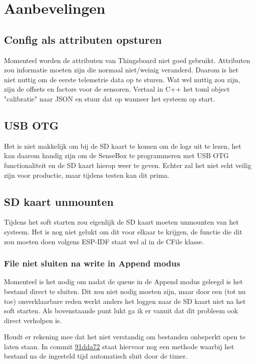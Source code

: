 \section{Aanbevelingen}

\subsection*{Config als attributen opsturen}

Momenteel worden de attributen van Thingsboard niet goed gebruikt. Attributen zou informatie moeten zijn die normaal niet/weinig veranderd. Daarom is het niet nuttig om de eerste telemetrie data op te sturen. Wat wel nuttig zou zijn, zijn de offsets en factors voor de sensoren. Vertaal in C++ het toml object "calibratie" naar JSON en stuur dat op wanneer het systeem op start.

\subsection*{USB OTG}

Het is niet makkelijk om bij de SD kaart te komen om de logs uit te lezen, het kan daarom handig zijn om de SenseBox te programmeren met USB OTG functionaliteit en de SD kaart hierop weer te geven. Echter zal het niet echt veilig zijn voor productie, maar tijdens testen kan dit prima.

\subsection*{SD kaart unmounten}

Tijdens het soft starten zou eigenlijk de SD kaart moeten unmounten van het systeem. Het is nog niet gelukt om dit voor elkaar te krijgen, de functie die dit zou moeten doen volgens ESP-IDF staat wel al in de CFile klasse.

\subsubsection*{File niet sluiten na write in Append modus}

Momenteel is het nodig om nadat de queue in de Append modus geleegd is het bestand direct te sluiten. Dit zou niet nodig moeten zijn, maar door een (tot nu toe) onverklaarbare reden werkt anders het loggen naar de SD kaart niet na het soft starten. Als bovenstaande punt lukt ga ik er vanuit dat dit probleem ook direct verholpen is.

\vspace{1em}
Houdt er rekening mee dat het niet verstandig om bestanden onbeperkt open te laten staan. In commit \href{https://github.com/SenseBoxTI/Firmware/pull/32/commits/91dda7281d7d693ca3e17bd1f71e198d45e3c273}{91dda72} staat hiervoor nog een methode waarbij het bestand na de ingesteld tijd automatisch sluit door de timer.

